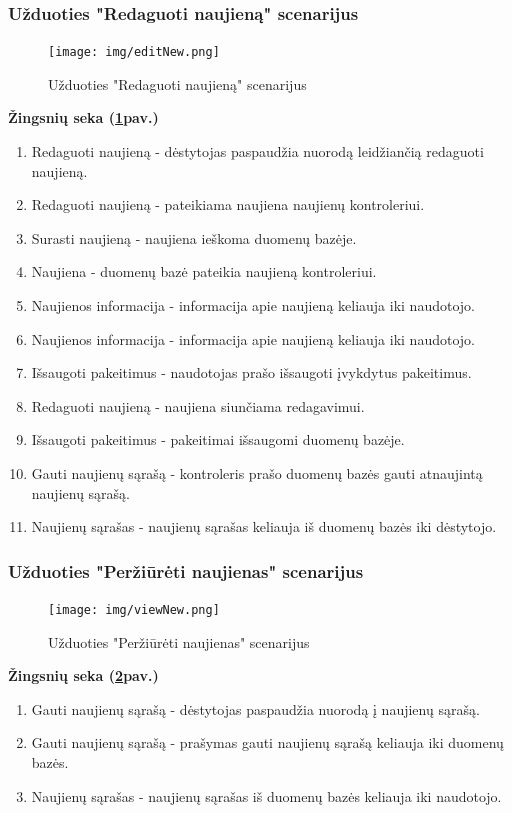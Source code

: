 \documentclass{VUMIFPSkursinis}
\begin{document}
\subsubsection{Užduoties "Redaguoti naujieną" scenarijus}
\begin{figure}[H]
	\centering
	\texttt{[image: img/editNew.png]}
	\caption{Užduoties "Redaguoti naujieną" scenarijus}
	\label{fig:edNew}
\end{figure}
\textbf{Žingsnių seka (\ref{fig:edNew}pav.)}\\
\begin{enumerate}
	\item Redaguoti naujieną - dėstytojas paspaudžia nuorodą leidžiančią redaguoti naujieną.
	\item Redaguoti naujieną - pateikiama naujiena naujienų kontroleriui.
	\item Surasti naujieną - naujiena ieškoma duomenų bazėje.
	\item Naujiena - duomenų bazė pateikia naujieną kontroleriui.
	\item Naujienos informacija -  informacija apie naujieną keliauja iki naudotojo.
	\item Naujienos informacija - informacija apie naujieną keliauja iki naudotojo.
	\item Išsaugoti pakeitimus - naudotojas prašo išsaugoti įvykdytus pakeitimus.
	\item Redaguoti naujieną - naujiena siunčiama redagavimui.
	\item Išsaugoti pakeitimus - pakeitimai išsaugomi duomenų bazėje.
	\item Gauti naujienų sąrašą - kontroleris prašo duomenų bazės gauti atnaujintą naujienų sąrašą.
	\item Naujienų sąrašas - naujienų sąrašas keliauja iš duomenų bazės iki dėstytojo.
\end{enumerate}
\subsubsection{Užduoties "Peržiūrėti naujienas" scenarijus}
\begin{figure}[H]
	\centering
	\texttt{[image: img/viewNew.png]}
	\caption{Užduoties "Peržiūrėti naujienas" scenarijus}
	\label{fig:viewNew}
\end{figure}
\textbf{Žingsnių seka (\ref{fig:viewNew}pav.)}\\
\begin{enumerate}
	\item Gauti naujienų sąrašą - dėstytojas paspaudžia nuorodą į naujienų sąrašą.
	\item Gauti naujienų sąrašą - prašymas gauti naujienų sąrašą keliauja iki duomenų bazės.
	\item Naujienų sąrašas - naujienų sąrašas iš duomenų bazės keliauja iki naudotojo.
\end{enumerate}
\end{document}
